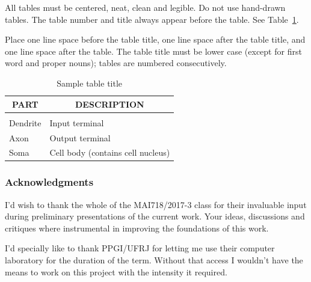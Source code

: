 \documentclass{article} %
\begin{document}
All tables must be centered, neat, clean and legible. Do not use hand-drawn
tables. The table number and title always appear before the table. See
Table~\ref{sample-table}.

Place one line space before the table title, one line space after the table
title, and one line space after the table. The table title must be lower case
(except for first word and proper nouns); tables are numbered consecutively.

\begin{table}[t]
\caption{Sample table title}
\label{sample-table}
\begin{center}
\begin{tabular}{ll}
\multicolumn{1}{c}{\bf PART}  &\multicolumn{1}{c}{\bf DESCRIPTION}
\\ \hline \\
Dendrite         &Input terminal \\
Axon             &Output terminal \\
Soma             &Cell body (contains cell nucleus) \\
\end{tabular}
\end{center}
\end{table}




\subsubsection*{Acknowledgments}
I'd wish to thank the whole of the MAI718/2017-3 class for their invaluable input during preliminary presentations of the current work. Your ideas, discussions and critiques where instrumental in improving the foundations of this work. 

I'd specially like to thank PPGI/UFRJ for letting me use their computer laboratory for the duration of the term. Without that access I wouldn't have the means to work on this project with the intensity it required.



\end{document}
